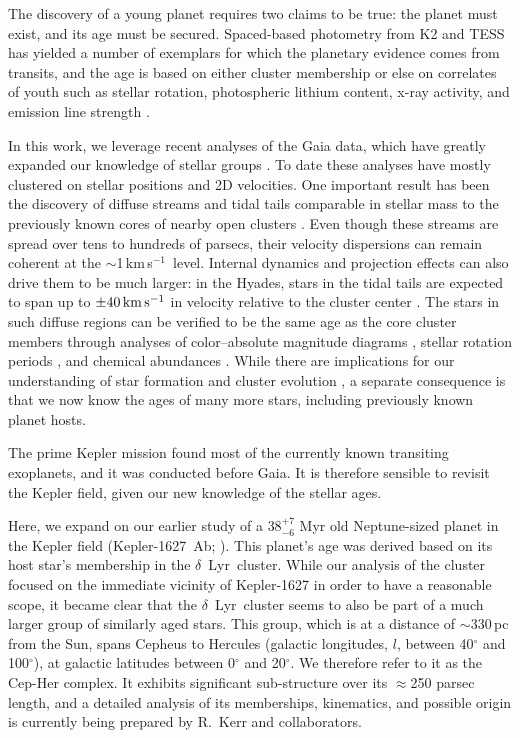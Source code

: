 \documentclass[12pt,twocolumn]{aastex63}
\newcommand{\kms}{\,km\,s$^{-1}$}
\newcommand{\mkms}{{\rm \,km\,s^{-1}}}  %
\begin{document}
The discovery of a young planet requires two claims to be true: the
planet must exist, and its age must be secured.  Spaced-based
photometry from K2 and TESS has yielded a number of exemplars for
which the planetary evidence comes from transits, and the age is based
on either cluster membership
\citep{Mann_et_al_2017,david_four_2019,newton_tess_2019,bouma_cluster_2020,nardiello_pathosII_2020}
or else on correlates of youth such as stellar rotation, photospheric
lithium content, x-ray activity, and emission line strength
\citep{zhou_2021_tois,hedges_toi-2076_2021}.

In this work, we leverage recent analyses of the Gaia data, which have
greatly expanded our knowledge of stellar groups
\citep[{e.g.},][]{CantatGaudin2018a,KounkelCovey2019,Kerr2021}.  To
date these analyses have mostly clustered on stellar positions and 2D
velocities.  One important result has been the discovery of diffuse
streams and tidal tails comparable in stellar mass to the previously
known cores of nearby open clusters
\citep{meingast_psceri_2019,Meingast2021,gagne_number_2021}.  Even
though these streams are spread over tens to hundreds of parsecs,
their velocity dispersions can remain coherent at the $\sim$1\kms\
level.  Internal dynamics and projection effects can also drive them
to be much larger: in the Hyades, stars in the tidal tails are
expected to span up to $\pm 40\mkms$ in velocity relative to the
cluster center \citep{jerabkova_800_2021}.  The stars in such diffuse
regions can be verified to be the same age as the core cluster members
through analyses of color--absolute magnitude diagrams
\citep{KounkelCovey2019}, stellar rotation periods
\citep{curtis_tess_2019,bouma_2021_ngc2516}, and chemical abundances
\citep{hawkins_2020}.  While there are implications for our
understanding of star formation and cluster evolution
\citep{dinnbier_tidal_2020}, a separate consequence is that we now
know the ages of many more stars, including previously known planet
hosts.

The prime Kepler mission \citep{borucki_kepler_2010} found most of the
currently known transiting exoplanets, and it was conducted before
Gaia.  It is therefore sensible to revisit the Kepler field, given our
new knowledge of the stellar ages.

Here, we expand on our earlier study of a $38^{+7}_{-6}$ Myr old
Neptune-sized planet in the Kepler field (Kepler-1627~Ab;
\citealt{bouma_kep1627_2022}).  This planet's age was derived based on
its host star's membership in the $\delta$\ Lyr\ cluster.  While our
analysis of the cluster focused on the immediate vicinity of
Kepler-1627 in order to have a reasonable scope,  it became clear that
the $\delta$\ Lyr\ cluster seems to also be part of a much larger
group of similarly aged stars.  This group, which is at a distance of
$\sim$330\,pc from the Sun, spans Cepheus to Hercules (galactic
longitudes, $l$, between 40$^\circ$ and 100$^\circ$), at galactic
latitudes between 0$^\circ$ and 20$^\circ$.  We therefore refer to it
as the Cep-Her complex.  It exhibits significant sub-structure over
its $\approx$250 parsec length, and a detailed analysis of its
memberships, kinematics, and possible origin is currently being
prepared by R.~Kerr and collaborators.
\end{document}
